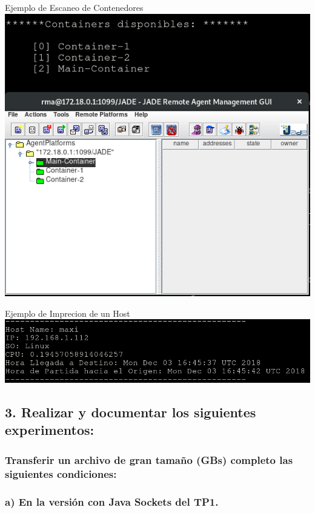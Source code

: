 \documentclass[11pt]{article}
\makeatletter
\def\maxwidth{\ifdim\Gin@nat@width>\linewidth\linewidth
    \else\Gin@nat@width\fi}
\let\Oldincludegraphics\includegraphics
\renewcommand{\includegraphics}[1]{\Oldincludegraphics[width=.8\maxwidth]{#1}}
\makeatother
\begin{document}
Ejemplo de Escaneo de Contenedores
\includegraphics{images/ListadoCircular-1.png}

Ejemplo de Imprecion de un Host \includegraphics{images/Escaneo.png}

    \hypertarget{realizar-y-documentar-los-siguientes-experimentos}{%
\subsection{3. Realizar y documentar los siguientes
experimentos:}\label{realizar-y-documentar-los-siguientes-experimentos}}

    \hypertarget{transferir-un-archivo-de-gran-tamauxf1o-gbs-completo-las-siguientes-condiciones}{%
\subsubsection{Transferir un archivo de gran tamaño (GBs) completo las
siguientes
condiciones:}\label{transferir-un-archivo-de-gran-tamauxf1o-gbs-completo-las-siguientes-condiciones}}

    \hypertarget{a-en-la-versiuxf3n-con-java-sockets-del-tp1.}{%
\subsubsection{a) En la versión con Java Sockets del
TP1.}\label{a-en-la-versiuxf3n-con-java-sockets-del-tp1.}}
\end{document}
